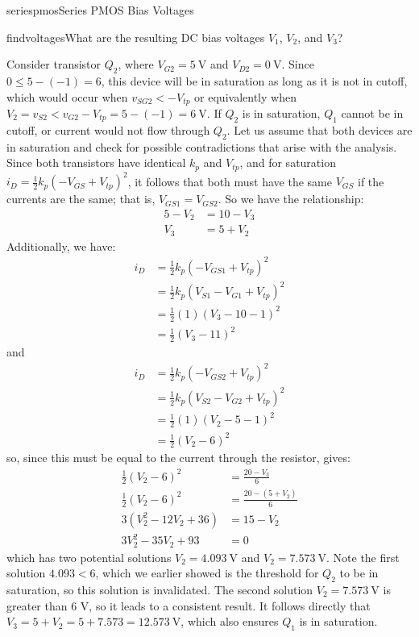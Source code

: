 \begin{mainquestion}{seriespmos}{Series PMOS Bias Voltages}
\begin{partquestion}{findvoltages}{What are the resulting DC bias voltages $V_{1}$, $V_{2}$, and $V_{3}$?}
\begin{answer}
Consider transistor $Q_{2}$, where $V_{G2} = \qty{5}{\volt}$ and $V_{D2} = \qty{0}{\volt}$. Since $0 \leq 5 - (-1) = 6$, this device will be in saturation as long as it is not in cutoff, which would occur when $v_{SG2} < -V_{tp}$ or equivalently when $V_{2} = v_{S2} < v_{G2} - V_{tp} = 5 - (-1) = \qty{6}{\volt}$. If $Q_{2}$ is in saturation, $Q_{1}$ cannot be in cutoff, or current would not flow through $Q_{2}$. Let us assume that both devices are in saturation and check for possible contradictions that arise with the analysis. Since both transistors have identical $k_{p}$ and $V_{tp}$, and for saturation $i_{D} = \frac{1}{2}k_{p}\left( - V_{GS} + V_{tp} \right)^{2}$, it follows that both must have the same $V_{GS}$ if the currents are the same; that is, $V_{GS1} = V_{GS2}$. So we have the relationship:
\begin{align*}
    5 - V_2 &= 10 - V_3 \\
    V_3 &= 5 + V_2
\end{align*}
Additionally, we have:
\begin{align*}
    i_D &= \frac{1}{2} k_p (-V_{GS1} +V_{tp})^2 \\
    &= \frac{1}{2} k_p (V_{S1} - V_{G1} + V_{tp})^2 \\
    &= \frac{1}{2} (1) (V_3 - 10 - 1)^2 \\
    &= \frac{1}{2} (V_3 - 11)^2
\end{align*}
and
\begin{align*}
    i_D &= \frac{1}{2} k_p (-V_{GS2} +V_{tp})^2 \\
    &= \frac{1}{2} k_p (V_{S2} - V_{G2} + V_{tp})^2 \\
    &= \frac{1}{2} (1) (V_2 - 5 - 1)^2 \\
    &= \frac{1}{2} (V_2 - 6)^2
\end{align*}
so, since this must be equal to the current through the resistor, gives:
\begin{align*}
    \frac{1}{2} (V_2 - 6)^2 &= \frac{20 - V_3}{6} \\
    \frac{1}{2} (V_2 - 6)^2 &= \frac{20 - (5+V_2)}{6} \\
    3 (V_2^2 - 12V_2 +36) &= 15 - V_2 \\
    3V_2^2 - 35V_2 + 93 &= 0
\end{align*}
which has two potential solutions $V_{2} = \qty{4.093}{\volt}$ and $V_{2} = \qty{7.573}{\volt}$. Note the first solution $4.093 < 6$, which we earlier showed is the threshold for $Q_{2}$ to be in saturation, so this solution is invalidated. The second solution $V_{2} = \qty{7.573}{\volt}$ is greater than 6 V, so it leads to a consistent result. It follows directly that $V_{3} = 5 + V_{2} = 5 + 7.573 = \qty{12.573}{\volt}$, which also ensures $Q_{1}$ is in saturation.
\end{answer}
\end{partquestion}


\end{mainquestion}
